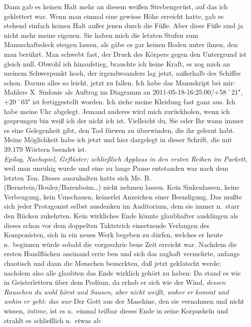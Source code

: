 \documentclass[
]{article}
\begin{document}
Dann gab es keinen Halt mehr an diesem weißen Strebengerüst, auf das ich
geklettert war. Wenn man einmal eine gewisse Höhe erreicht hatte, gab es
stehend einfach keinen Halt außer jenen durch die Füße. Aber diese Füße
sind ja nicht mehr meine eigenen. Sie haben mich die letzten Stufen zum
Mannschaftsdeck steigen lassen, als gäbe es gar keinen Boden unter
ihnen, den man berührt. Man schwebt fast, der Druck des Körpers gegen
den Untergrund ist gleich null. Obwohl ich hinaufstieg, brauchte ich
keine Kraft, es zog mich an meinem Schwerpunkt hoch, der irgendwoanders
lag jetzt, außerhalb des Schiffes schon. Darum alles so leicht, jetzt zu
fallen. Ich habe das Manuskript bei mir:\\
Mahlers X. Sinfonie als Auftrag im Diagramm an
2011-05-18-16:25:00/+58˚21", +20˚03"
ist fertiggestellt worden. Ich ziehe meine Kleidung fast ganz aus. Ich
habe meine Uhr abgelegt. Jemand anderes wird mich zurückholen, wenn ich
gesprungen bin weiß ich der nicht ich ist. Vielleicht du, Sie oder Ihr
wann immer es eine Gelegenheit gibt, den Tod fürwen zu überwinden, die
ihr gelernt habt. Meine Möglichkeit habe ich jetzt und hier dargelegt in
dieser Schrift, die mit 39.179 Wörtern beendet ist.\\
\emph{Epilog, Nachspiel, Geflüster; schließlich Applaus in den ersten
Reihen im Parkett, }weil man unruhig wurde und eine zu lange Pause
entstanden war nach dem letzten Ton. Dieses auszuhalten hatte sich Me.
B. (Bernstein/Boulez/Barenboim\ldots) nicht nehmen lassen. Kein
Sinkenlassen, keine Verbeugung, kein Umschauen, keinerlei Anzeichen
einer Beendigung. Das mußte sich jeder Protagonist selbst ausdenken im
Auditorium, dem sie immer n.~starr den Rücken zukehrten. Kein wirkliches
Ende könnte glaubhafter ausklingen als dieses schon vor dem doppelten
Taktstrich einsetzende Verlangen des Komponisten, sich in ein neues Werk
begeben zu dürfen, welches er heute n.~beginnen würde sobald die
vorgeschrie bene Zeit erreicht war. Nachdem die ersten Handflächen
aneinand errie ben und sich das zaghaft vermehrte, anfangs chaotisch und
dann die Menschen bemerkten, daß jetzt geklatscht werde; nachdem also
alle glaubten das Ende wirklich gehört zu haben: Da stand es wie in
Geisterlettern über dem Podium, da erhob er sich wie der Wind,
\emph{dessen Rauschen du wohl hörst und Sausen, aber nicht weißt, woher
er kommt und wohin er geht: das war }Der Gott aus der Maschine, den sie
vernahmen und nicht wissen, \emph{intime}, ist es n.~einmal teilbar
dieses Ende in seine Korpuskeln und strahlt es schließlich n.~etwas ab
\end{document}
